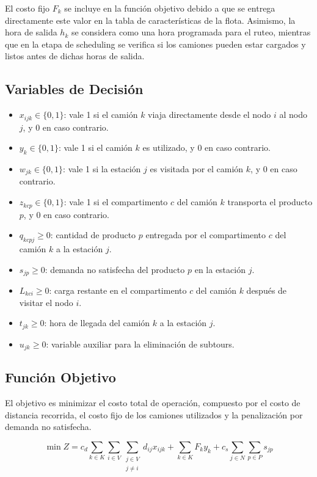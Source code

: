 El costo fijo $F_k$ se incluye en la función objetivo debido a que se entrega directamente este valor en la tabla de características de la flota. Asimismo, la hora de salida $h_k$ se considera como una hora programada para el ruteo, mientras que en la etapa de scheduling se verifica si los camiones pueden estar cargados y listos antes de dichas horas de salida.

\subsection{Variables de Decisión}

\begin{itemize}
    \item $x_{ijk} \in \{0, 1\}$: vale 1 si el camión $k$ viaja directamente desde el nodo $i$ al nodo $j$, y 0 en caso contrario.
    \item $y_k \in \{0, 1\}$: vale 1 si el camión $k$ es utilizado, y 0 en caso contrario.
    \item $w_{jk} \in \{0, 1\}$: vale 1 si la estación $j$ es visitada por el camión $k$, y 0 en caso contrario.
    \item $z_{kcp} \in \{0, 1\}$: vale 1 si el compartimento $c$ del camión $k$ transporta el producto $p$, y 0 en caso contrario.
    \item $q_{kcpj} \geq 0$: cantidad de producto $p$ entregada por el compartimento $c$ del camión $k$ a la estación $j$.
    \item $s_{jp} \geq 0$: demanda no satisfecha del producto $p$ en la estación $j$.
    \item $L_{kci} \geq 0$: carga restante en el compartimento $c$ del camión $k$ después de visitar el nodo $i$.
    \item $t_{jk} \geq 0$: hora de llegada del camión $k$ a la estación $j$.
    \item $u_{jk} \geq 0$: variable auxiliar para la eliminación de subtours.
\end{itemize}

\subsection{Función Objetivo}

El objetivo es minimizar el costo total de operación, compuesto por el costo de distancia recorrida, el costo fijo de los camiones utilizados y la penalización por demanda no satisfecha.

\begin{equation}
    \min Z =
    c_d \sum_{k \in K} \sum_{i \in V} \sum_{\substack{j \in V \\ j \neq i}} d_{ij} x_{ijk}
    +
    \sum_{k \in K} F_k y_k
    +
    c_s \sum_{j \in N} \sum_{p \in P} s_{jp}
\end{equation}

